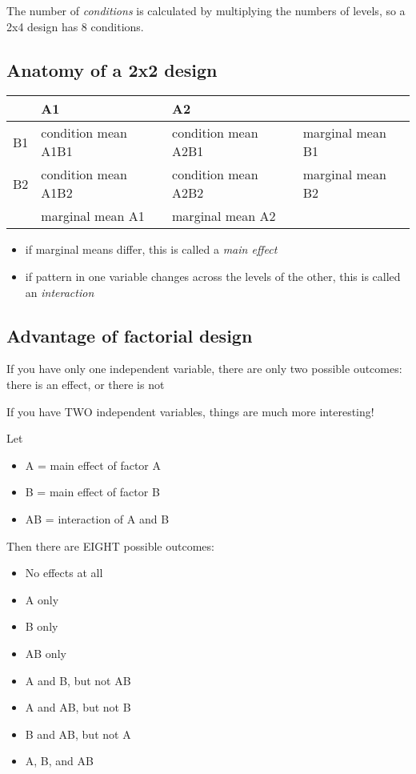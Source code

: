 \documentclass[11pt]{article}
\begin{document}
The number of \emph{conditions} is calculated by multiplying the numbers of levels, so a 2x4 design has 8 conditions.

\subsection*{Anatomy of a 2x2 design}
\label{sec-2-1}

\begin{center}
\begin{tabular}{llll}
 & A1 & A2 & \\
\hline
B1 & condition mean A1B1 & condition mean A2B1 & marginal mean B1\\
B2 & condition mean A1B2 & condition mean A2B2 & marginal mean B2\\
\hline
 & marginal mean A1 & marginal mean A2 & \\
\end{tabular}
\end{center}

\begin{itemize}
\item if marginal means differ, this is called a \emph{main effect}
\item if pattern in one variable changes across the levels of the other, this is called an \emph{interaction}
\end{itemize}

\subsection*{Advantage of factorial design}
\label{sec-2-2}

If you have only one independent variable, there are only two possible outcomes: there is an effect, or there is not

If you have TWO independent variables, things are much more interesting!

Let 
\begin{itemize}
\item A = main effect of factor A
\item B = main effect of factor B
\item AB = interaction of A and B
\end{itemize}

Then there are EIGHT possible outcomes:
\begin{itemize}
\item No effects at all
\item A only
\item B only
\item AB only
\item A and B, but not AB
\item A and AB, but not B
\item B and AB, but not A
\item A, B, and AB
\end{itemize}
\end{document}
